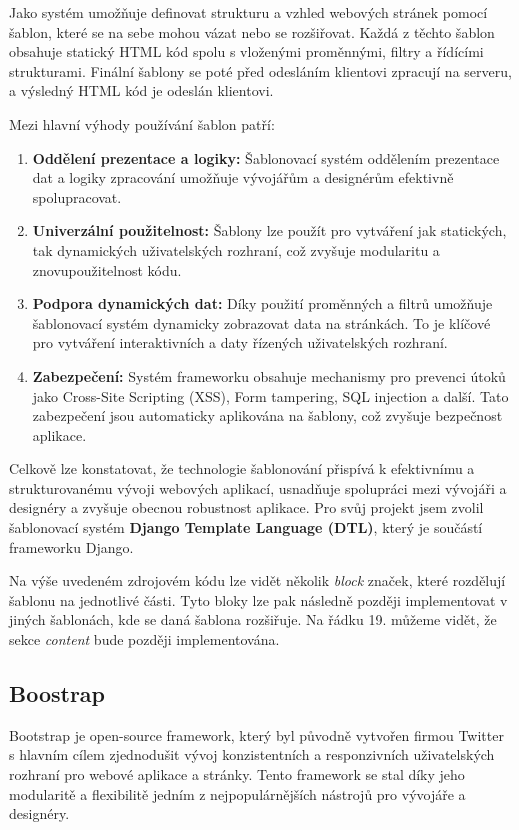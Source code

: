 Jako systém umožňuje definovat strukturu a vzhled webových stránek pomocí šablon, které se na sebe mohou vázat nebo se rozšiřovat. Každá z těchto šablon obsahuje statický HTML kód spolu s vloženými proměnnými, filtry a řídícími strukturami. Finální šablony se poté před odesláním klientovi zpracují na serveru, a výsledný HTML kód je odeslán klientovi.

\noindent
Mezi hlavní výhody používání šablon patří:
\begin{enumerate}
    \item \textbf{Oddělení prezentace a logiky:} Šablonovací systém oddělením prezentace dat a logiky zpracování umožňuje vývojářům a designérům efektivně spolupracovat.
    \item \textbf{Univerzální použitelnost:} Šablony lze použít pro vytváření jak statických, tak dynamických uživatelských rozhraní, což zvyšuje modularitu a znovupoužitelnost kódu.
    \item \textbf{Podpora dynamických dat:} Díky použití proměnných a filtrů umožňuje šablonovací systém dynamicky zobrazovat data na stránkách. To je klíčové pro vytváření interaktivních a daty řízených uživatelských rozhraní.
    \item \textbf{Zabezpečení:} Systém frameworku obsahuje mechanismy pro prevenci útoků jako Cross-Site Scripting (XSS), Form tampering, SQL injection a další. Tato zabezpečení jsou automaticky aplikována na šablony, což zvyšuje bezpečnost aplikace.
\end{enumerate}

Celkově lze konstatovat, že technologie šablonování přispívá k efektivnímu a strukturovanému vývoji webových aplikací, usnadňuje spolupráci mezi vývojáři a designéry a zvyšuje obecnou robustnost aplikace. Pro svůj projekt jsem zvolil šablonovací systém \textbf{Django Template Language (DTL)}, který je součástí frameworku Django.



Na výše uvedeném zdrojovém kódu lze vidět několik \textit{block} značek, které rozdělují šablonu na jednotlivé části. Tyto bloky lze pak následně později implementovat v jiných šablonách, kde se daná šablona rozšiřuje. Na řádku 19. můžeme vidět, že sekce \textit{content} bude později implementována.

\subsection{Boostrap}
\label{subsec:dev-technology-bootstrap}
Bootstrap je open-source framework, který byl původně vytvořen firmou Twitter s hlavním cílem zjednodušit vývoj konzistentních a responzivních uživatelských rozhraní pro webové aplikace a stránky. Tento framework se stal díky jeho modularitě a flexibilitě jedním z nejpopulárnějších nástrojů pro vývojáře a designéry.

